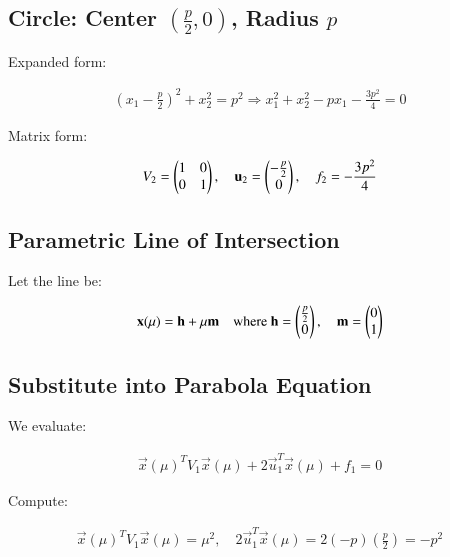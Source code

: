 \documentclass{article}
\begin{document}
\subsection*{Circle: Center $(\frac{p}{2}, 0)$, Radius $p$}

Expanded form:


\begin{align}
(x_1 - \frac{p}{2})^2 + x_2^2 = p^2
\Rightarrow x_1^2 + x_2^2 - p x_1 - \frac{3p^2}{4} = 0
\end{align}



Matrix form:


\begin{align}
V_2 = \begin{pmatrix}1 & 0 \\ 0 & 1\end{pmatrix}, \quad
\mathbf{u}_2 = \begin{pmatrix}-\frac{p}{2} \\ 0\end{pmatrix}, \quad
f_2 = -\frac{3p^2}{4}
\end{align}



\subsection*{Parametric Line of Intersection}

Let the line be:


\begin{align}
\mathbf{x}(\mu) = \mathbf{h} + \mu \mathbf{m}
\quad \text{where } \mathbf{h} = \begin{pmatrix}\frac{p}{2} \\ 0\end{pmatrix}, \quad
\mathbf{m} = \begin{pmatrix}0 \\ 1\end{pmatrix}
\end{align}



\subsection*{Substitute into Parabola Equation}

We evaluate:


\begin{align}
\vec{x}(\mu)^T V_1 \vec{x}(\mu) + 2 \vec{u}_1^T \vec{x}(\mu) + f_1 = 0
\end{align}



Compute:


\begin{align}
\vec{x}(\mu)^T V_1 \vec{x}(\mu) = \mu^2, \quad
2 \vec{u}_1^T \vec{x}(\mu) = 2(-p)(\frac{p}{2}) = -p^2
\end{align}
\end{document}
